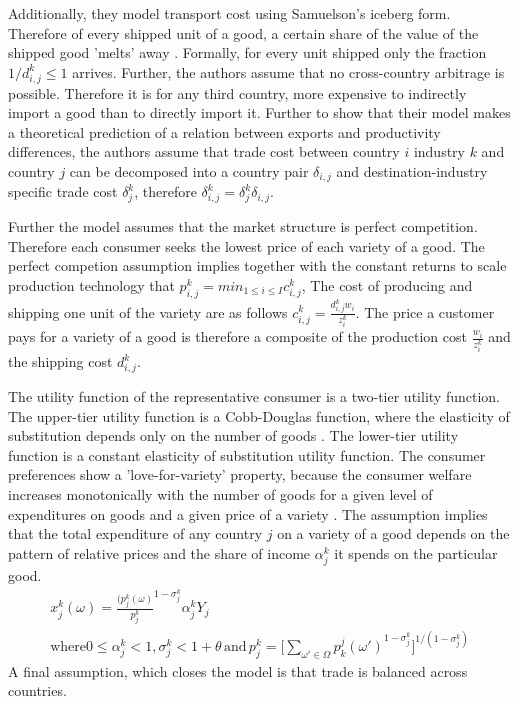 Additionally, they model transport cost using Samuelson{'}s iceberg form.
Therefore of every shipped unit of a good, a certain share of the value of the shipped good 'melts' away  \parencite[p.78]{combes}.
 Formally, for every unit shipped only the fraction $1/d^k_{i,j} \leq 1$ arrives.
 Further, the authors assume that no cross-country arbitrage is possible.
  Therefore it is for any third country, more expensive to indirectly import a good than to directly import it.
  Further to show that their model makes a theoretical prediction of a relation between exports and productivity differences,
  the authors assume that trade cost between country $i$ industry $k$ and country $j$  can be decomposed into a country pair $\delta_{i,j}$
  and destination-industry specific trade cost $\delta^k_j $, therefore $\delta^k_{i,j}=\delta^k_j \delta_{i,j}$.  \par %
 \pqr  %
Further the model assumes that the market structure is perfect competition.
Therefore each consumer seeks the lowest price of each variety of a good.
The perfect competion assumption implies together with the constant returns to scale production technology that $p^k_{i,j}=min_{1 \leq i \leq I}c^k_{i,j}$,
The cost of producing and shipping one unit of the variety are as follows $c^k_{i,j}=\frac{d^k_{i,j} w_i}{z_i^k}$.
The price a customer pays for a variety of a good is therefore a composite of the production cost $\frac{w_i}{z_i^k}$
and the shipping cost $d^k_{i,j}$.  \par
The utility function of the representative consumer is a two-tier utility function.
The upper-tier utility function is a Cobb-Douglas function, where the elasticity of substitution depends only on the number of goods \parencite[p. 129]{helpman}.
The lower-tier utility function is a constant elasticity of substitution utility function.%
The consumer preferences show a 'love-for-variety' property, because the consumer welfare increases monotonically with the number of goods  for a given level of expenditures on goods and a given price of a variety  \textcite[p. 118]{helpman}.
 The assumption implies that the total expenditure of any country $j$ on a variety of a good depends on the pattern of relative prices and the share of income $\alpha^k_j$ it spends on the particular good.
\begin{align*}
x^k_{j}(\omega)= \frac{(p^k_{j}(\omega) } {p^k_{j} }^{1-\sigma_{j}^k}  \alpha^k_j Y_j \\ \text{where} 0 \leq \alpha_j^k < 1,\sigma_{j}^k < 1+\theta \, \text{and} \, {p^k_{j} =[ \sum_{\omega' \in \Omega} p_k^j (\omega')}^{1-\sigma_j^k}]^{1/({1-\sigma_j^k})    }
\end{align*}  %
A final assumption, which closes the model is that  trade is balanced across countries.

